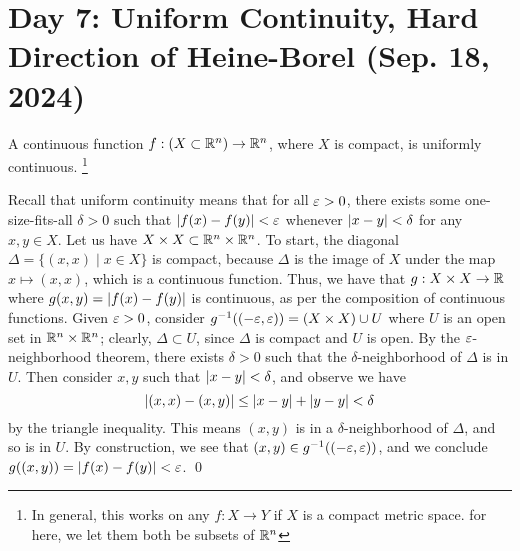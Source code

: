 \section{Day 7: Uniform Continuity, Hard Direction of Heine-Borel (Sep. 18, 2024)}
\begin{simplethm}
    A continuous function $f : (X \subset \mathbb R^n) \to \mathbb R^n$, where $X$ is compact, is uniformly continuous. \footnote{In general, this works on any $f : X \to Y$ if $X$ is a compact metric space. for here, we let them both be subsets of $\mathbb R^n$}
\end{simplethm}
\noindent Recall that uniform continuity means that for all $\varepsilon > 0$, there exists some one-size-fits-all $\delta > 0$ such that $\left\lvert f(x) - f(y) \right\rvert < \varepsilon$ whenever $\left\lvert x - y \right\rvert < \delta$ for any $x, y \in X$.
\medskip\newline
\noindent Let us have $X \times X \subset \mathbb R^n \times \mathbb R^n$. To start, the diagonal $\Delta = \{(x, x) \mid x \in X\}$ is compact, because $\Delta$ is the image of $X$ under the map $x \mapsto (x, x)$, which is a continuous function. Thus, we have that $g : X \times X \to \mathbb R$ where $g(x, y) = \left\lvert f(x) - f(y) \right\rvert$ is continuous, as per the composition of continuous functions.
\medskip\newline
Given $\varepsilon > 0$, consider $g^{-1}((-\varepsilon, \varepsilon)) = (X \times X) \cup U$ where $U$ is an open set in $\mathbb R^n \times \mathbb R^n$; clearly, $\Delta \subset U$, since $\Delta$ is compact and $U$ is open. By the $\varepsilon$-neighborhood theorem, there exists $\delta > 0$ such that the $\delta$-neighborhood of $\Delta$ is in $U$. Then consider $x, y$ such that $\left\lvert x - y \right\rvert < \delta$, and observe we have
\[ \left\lvert (x, x) - (x, y) \right\rvert \leq \left\lvert x - y \right\rvert + \left\lvert y - y \right\rvert < \delta \]
by the triangle inequality. This means $(x, y)$ is in a $\delta$-neighborhood of $\Delta$, and so is in $U$. By construction, we see that $(x, y) \in g^{-1}((-\varepsilon, \varepsilon))$, and we conclude $g((x, y)) = \left\lvert f(x) - f(y) \right\rvert < \varepsilon$. \qed

